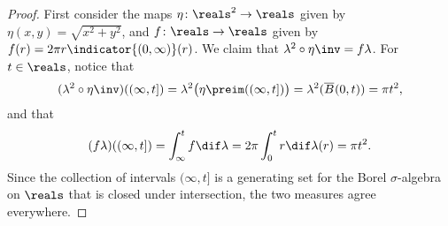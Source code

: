 \documentclass[article, a4paper, 11pt, oneside]{memoir}
\numberwithin{equation}{chapter}
\begin{document}
\begin{proof}
    First consider the maps $\eta \colon \reals^2 \to \reals$ given by $\eta(x,y) = \sqrt{x^2 + y^2}$, and $f \colon \reals \to \reals$ given by $f(r) = 2\pi r \indicator{(0,\infty)}(r)$. We claim that $\lambda^2 \circ \eta\inv = f \lambda$. For $t \in \reals$, notice that
    \begin{equation*}
        (\lambda^2 \circ \eta\inv)((\infty,t])
            = \lambda^2 \bigl( \eta\preim((\infty,t]) \bigr)
            = \lambda^2(\cball{0}{t})
            = \pi t^2,
    \end{equation*}
    and that
    \begin{equation*}
        (f\lambda)((\infty,t])
            = \int_\infty^t f \dif \lambda
            = 2\pi \int_0^t r \dif \lambda(r)
            = \pi t^2.
    \end{equation*}
    Since the collection of intervals $(\infty,t]$ is a generating set for the Borel $\sigma$-algebra on $\reals$ that is closed under intersection, the two measures agree everywhere.


\end{proof}
\end{document}
